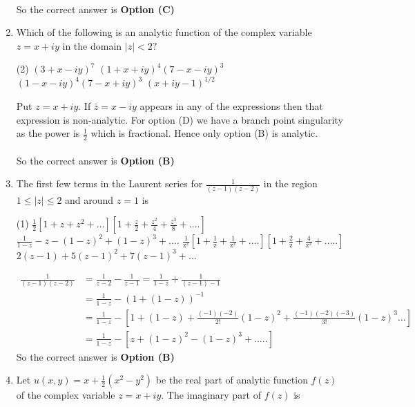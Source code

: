 \begin{note}
\begin{enumerate}[label=\color{ocre}\textbf{\arabic*.}]
\begin{answer}
\begin{align*}
		\end{align*}
		So the correct answer is \textbf{Option (C)}
	\end{answer}
	\item Which of the following is an analytic function of the complex variable $z=x+i y$ in the domain $|z|<2 ?$
	{}
	\begin{tasks}(2)
		\task[\textbf{A.}] $(3+x-i y)^{7}$
		\task[\textbf{B.}] $(1+x+i y)^{4}(7-x-i y)^{3}$
		\task[\textbf{C.}] $(1-x-i y)^{4}(7-x+i y)^{3}$
		\task[\textbf{D.}] $(x+i y-1)^{1 / 2}$
	\end{tasks}
	\begin{answer}
		Put $z=x+i y .$ If $\bar{z}=x-i y$ appears in any of the expressions then that expression is non-analytic. For option (D) we have a branch point singularity as the power is $\frac{1}{2}$ which is fractional. Hence only option (B) is analytic.\\\\
		So the correct answer is \textbf{Option (B)}
	\end{answer}
	\item The first few terms in the Laurent series for $\frac{1}{(z-1)(z-2)}$ in the region $1 \leq|z| \leq 2$ and around $z=1$ is
	{}
	\begin{tasks}(1)
		\task[\textbf{A.}] $\frac{1}{2}\left[1+z+z^{2}+\ldots\right]\left[1+\frac{z}{2}+\frac{z^{2}}{4}+\frac{z^{3}}{8}+\ldots .\right]$
		\task[\textbf{B.}] $\frac{1}{1-z}-z-(1-z)^{2}+(1-z)^{3}+\ldots .$
		\task[\textbf{C.}] $\frac{1}{\mathrm{z}^{2}}\left[1+\frac{1}{\mathrm{z}}+\frac{1}{\mathrm{z}^{2}}+\ldots .\right]\left[1+\frac{2}{\mathrm{z}}+\frac{4}{\mathrm{z}^{2}}+\ldots . .\right]$
		\task[\textbf{D.}]  $2(z-1)+5(z-1)^{2}+7(z-1)^{3}+\ldots$
	\end{tasks}
	\begin{answer}
		\begin{align*}
		\frac{1}{(z-1)(z-2)}&=\frac{1}{z-2}-\frac{1}{z-1}=\frac{1}{1-z}+\frac{1}{(z-1)-1}\\&=\frac{1}{1-z}-(1+(1-z))^{-1}\\
		&=\frac{1}{1-z}-\left[1+(1-z)+\frac{(-1)(-2)}{2 !}(1-z)^{2}+\frac{(-1)(-2)(-3)}{3 !}(1-z)^{3} \ldots\right]\\
		&=\frac{1}{1-z}-\left[z+(1-z)^{2}-(1-z)^{3}+\ldots . .\right]
		\end{align*}
		So the correct answer is \textbf{Option (B)}
	\end{answer}
	\item Let $u(x, y)=x+\frac{1}{2}\left(x^{2}-y^{2}\right)$ be the real part of analytic function $f(z)$ of the complex variable $z=x+i y$. The imaginary part of $f(z)$ is

\end{enumerate}
\end{note}
